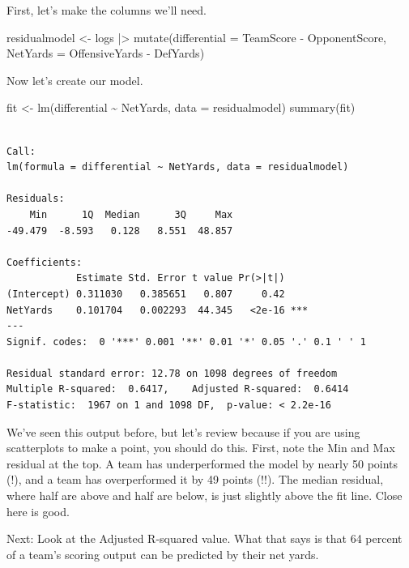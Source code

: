 \documentclass[
  letterpaper,
  DIV=11,
  numbers=noendperiod]{scrreprt}
\newenvironment{Shaded}{\begin{snugshade}}{\end{snugshade}}
\newcommand{\AttributeTok}[1]{\textcolor[rgb]{0.40,0.45,0.13}{#1}}
\newcommand{\FunctionTok}[1]{\textcolor[rgb]{0.28,0.35,0.67}{#1}}
\newcommand{\NormalTok}[1]{\textcolor[rgb]{0.00,0.23,0.31}{#1}}
\newcommand{\OtherTok}[1]{\textcolor[rgb]{0.00,0.23,0.31}{#1}}
\newcommand{\SpecialCharTok}[1]{\textcolor[rgb]{0.37,0.37,0.37}{#1}}
\begin{document}
First, let's make the columns we'll need.

\begin{Shaded}
\begin{Highlighting}[]
\NormalTok{residualmodel }\OtherTok{\textless{}{-}}\NormalTok{ logs }\SpecialCharTok{|\textgreater{}} \FunctionTok{mutate}\NormalTok{(}\AttributeTok{differential =}\NormalTok{ TeamScore }\SpecialCharTok{{-}}\NormalTok{ OpponentScore, }\AttributeTok{NetYards =}\NormalTok{ OffensiveYards }\SpecialCharTok{{-}}\NormalTok{ DefYards)}
\end{Highlighting}
\end{Shaded}

Now let's create our model.

\begin{Shaded}
\begin{Highlighting}[]
\NormalTok{fit }\OtherTok{\textless{}{-}} \FunctionTok{lm}\NormalTok{(differential }\SpecialCharTok{\textasciitilde{}}\NormalTok{ NetYards, }\AttributeTok{data =}\NormalTok{ residualmodel)}
\FunctionTok{summary}\NormalTok{(fit)}
\end{Highlighting}
\end{Shaded}

\begin{verbatim}

Call:
lm(formula = differential ~ NetYards, data = residualmodel)

Residuals:
    Min      1Q  Median      3Q     Max 
-49.479  -8.593   0.128   8.551  48.857 

Coefficients:
            Estimate Std. Error t value Pr(>|t|)    
(Intercept) 0.311030   0.385651   0.807     0.42    
NetYards    0.101704   0.002293  44.345   <2e-16 ***
---
Signif. codes:  0 '***' 0.001 '**' 0.01 '*' 0.05 '.' 0.1 ' ' 1

Residual standard error: 12.78 on 1098 degrees of freedom
Multiple R-squared:  0.6417,    Adjusted R-squared:  0.6414 
F-statistic:  1967 on 1 and 1098 DF,  p-value: < 2.2e-16
\end{verbatim}

We've seen this output before, but let's review because if you are using
scatterplots to make a point, you should do this. First, note the Min
and Max residual at the top. A team has underperformed the model by
nearly 50 points (!), and a team has overperformed it by 49 points (!!).
The median residual, where half are above and half are below, is just
slightly above the fit line. Close here is good.

Next: Look at the Adjusted R-squared value. What that says is that 64
percent of a team's scoring output can be predicted by their net yards.
\end{document}

